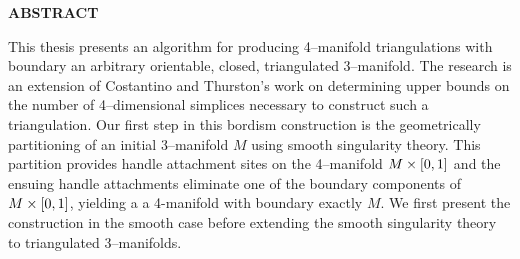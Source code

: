 \newpage
\newpage{}


\begin{center}
\textbf{ABSTRACT}
\end{center}

This thesis presents an algorithm for producing 4--manifold triangulations with boundary an arbitrary orientable, closed, triangulated 3--manifold.
The research is an extension of Costantino and Thurston's work on determining upper bounds on the number of 4--dimensional simplices necessary to construct such a triangulation.
Our first step in this bordism construction is the geometrically partitioning of an initial 3--manifold $M$ using smooth singularity theory.
This partition provides handle attachment sites on the 4--manifold $M \times [0,1]$ and the ensuing handle attachments eliminate one of the boundary components of $M\times [0,1]$, yielding a a 4-manifold with boundary exactly $M$.
We first present the construction in the smooth case before extending the smooth singularity theory to triangulated 3--manifolds.

\pagebreak